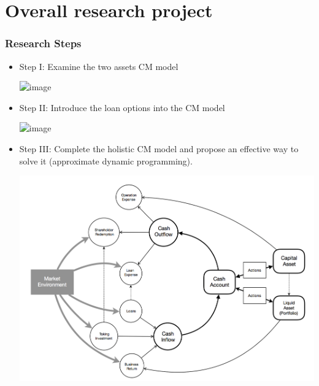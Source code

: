 \documentclass{beamer}
\begin{document}
\section{Overall research project}
\begin{frame}
\frametitle{Research Steps}
\begin{itemize}
\item <2-> Step I: Examine the two assets CM model

\includegraphics<3>[scale = 0.25]{twoAcMod.png}

\item <4-> Step II: Introduce the loan options into the CM model

\includegraphics<5>[scale = 0.45]{loan.png}


\item <6-> Step III: Complete the holistic CM model and propose an effective way to solve it (approximate dynamic programming).

\includegraphics[scale = 0.18]{Holistic.png}


\end{itemize}
\end{frame}
\end{document}
